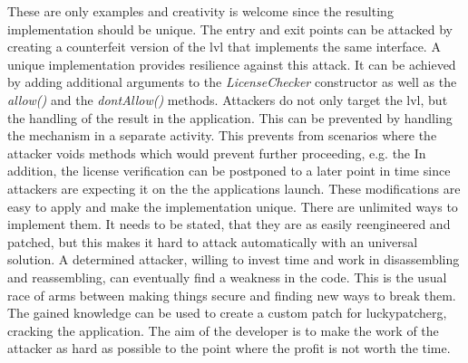 These are only examples and creativity is welcome since the resulting implementation should be unique. \cite{developersSecuring}
\newline
The entry and exit points can be attacked by creating a counterfeit version of the \gls{lvl} that implements the same interface.
A unique implementation provides resilience against this attack.
It can be achieved by adding additional arguments to the \textit{LicenseChecker} constructor as well as the \textit{allow()} and the \textit{dontAllow()} methods. \cite{developersSecuring}
\newline
Attackers do not only target the \gls{lvl}, but the handling of the result in the application.
This can be prevented by handling the mechanism in a separate activity.
This prevents from scenarios where the attacker voids methods which would prevent further proceeding, e.g. the
In addition, the license verification can be postponed to a later point in time since attackers are expecting it on the the applications launch. \cite{developersSecuring}
\newline
These modifications are easy to apply and make the implementation unique.
There are unlimited ways to implement them.
It needs to be stated, that they are as easily reengineered and patched, but this makes it hard to attack automatically with an universal solution.
A determined attacker, willing to invest time and work in disassembling and reassembling, can eventually find a weakness in the code.
This is the usual race of arms between making things secure and finding new ways to break them.
The gained knowledge can be used to create a custom patch for \gls{luckypatcherg}, cracking the application.
The aim of the developer is to make the work of the attacker as hard as possible to the point where the profit is not worth the time. \cite{developersSecuring}
